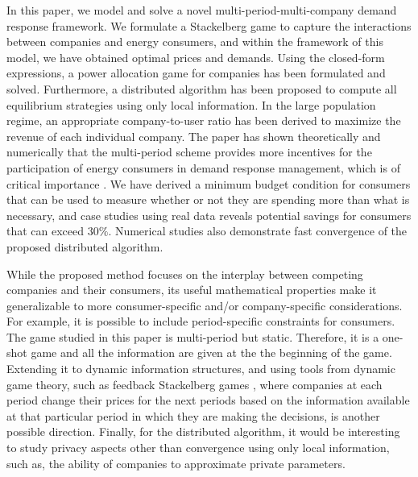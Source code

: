 In this paper, we model and solve a novel multi-period-multi-company demand response framework. We formulate a Stackelberg game to capture the interactions between companies and energy consumers, and within the framework of this model, we have obtained optimal prices and demands. Using the closed-form expressions, a power allocation game for companies has been formulated and solved. Furthermore, a distributed algorithm has been proposed to compute all equilibrium strategies using only local information. In the large population regime, an appropriate company-to-user ratio has been derived to maximize the revenue of each individual company.  The paper has shown theoretically and numerically that the multi-period scheme provides more incentives for the participation of energy consumers in demand response management, which is of critical importance \cite{DOECOM}. {\color{black} We have derived a minimum budget condition for consumers that can be used to measure whether or not they are spending more than what is necessary, and case studies using real data reveals potential savings for consumers that can exceed $30\%$}. Numerical studies also demonstrate fast convergence of the proposed distributed algorithm. 


While the proposed method focuses on the interplay between competing companies and their consumers, its useful mathematical properties make it generalizable to more consumer-specific and/or company-specific considerations.  For example, it is possible to include period-specific constraints for consumers. The game studied in this paper is multi-period but static. {\color{black} Therefore, it is a one-shot game and all the information are given at the the beginning of the game. Extending it to dynamic information structures, and using tools from dynamic game theory, such as feedback Stackelberg games \cite{basar}, where companies at each period change their prices for the next periods based on the information available at that particular period in which they are making the decisions, is another possible direction. Finally, for the distributed algorithm, it would be interesting to study privacy aspects other than convergence using only local information, such as, the ability of companies to approximate private parameters.}

